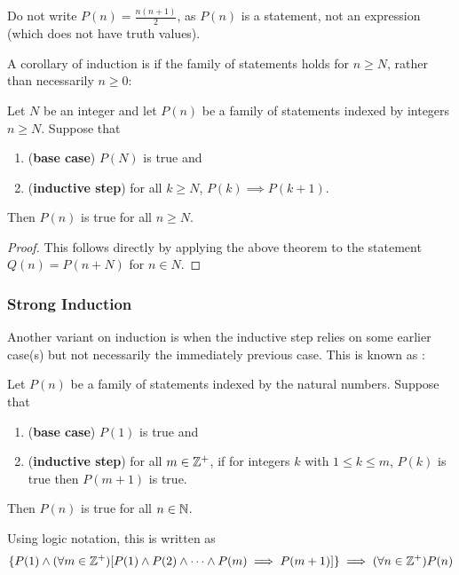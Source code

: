 \begin{remark}
Do not write $P(n)=\frac{n(n+1)}{2}$, as $P(n)$ is a statement, not an expression (which does not have truth values).
\end{remark}

A corollary of induction is if the family of statements holds for $n \ge N$, rather than necessarily $n \ge 0$:

\begin{corollary}
Let $N$ be an integer and let $P(n)$ be a family of statements indexed by integers $n \ge N$. Suppose that 
\begin{enumerate}[label=(\roman*)]
\item (\textbf{base case}) $P(N)$ is true and
\item (\textbf{inductive step}) for all $k \ge N$, $P(k) \implies P(k+1)$. 
\end{enumerate}
Then $P(n)$ is true for all $n \ge N$.
\end{corollary}

\begin{proof}
This follows directly by applying the above theorem to the statement $Q(n) = P(n+N)$ for $n \in N$.
\end{proof}

\subsubsection{Strong Induction}
Another variant on induction is when the inductive step relies on some earlier case(s) but not necessarily the immediately previous case. This is known as :

\begin{theorem}
Let $P(n)$ be a family of statements indexed by the natural numbers. Suppose that
\begin{enumerate}[label=(\roman*)]
\item (\textbf{base case}) $P(1)$ is true and
\item (\textbf{inductive step}) for all $m \in \mathbb Z^+$, if for integers $k$ with $1 \le k \le m$, $P(k)$ is true then $P(m+1)$ is true.
\end{enumerate}
Then $P(n)$ is true for all $n \in \mathbb N$.
\end{theorem}

Using logic notation, this is written as
\[ \{P(1) \land (\forall m \in \mathbb Z^+) [P(1) \land P(2) \land \cdots \land P(m) \implies P(m+1)]\} \implies (\forall n \in \mathbb Z^+)P(n) \]

